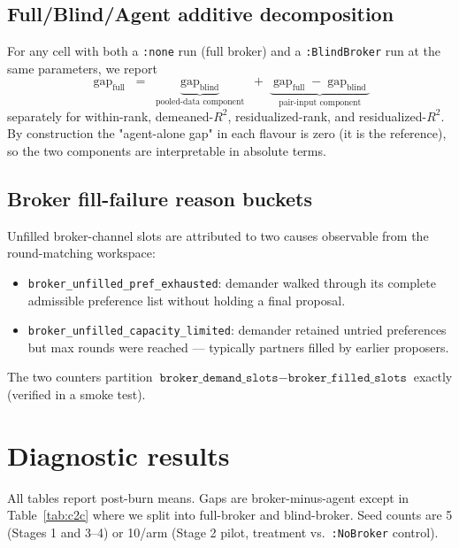 \documentclass[11pt,a4paper]{article}
\begin{document}
\subsection{Full/Blind/Agent additive decomposition}
For any cell with both a \texttt{:none} run (full broker) and a \texttt{:BlindBroker} run at the same parameters, we report
\begin{equation}
\label{eq:fullblind}
\operatorname{gap}_{\text{full}} \;=\; \underbrace{\operatorname{gap}_{\text{blind}}}_{\text{pooled-data component}}
\;+\; \underbrace{\operatorname{gap}_{\text{full}} - \operatorname{gap}_{\text{blind}}}_{\text{pair-input component}}
\end{equation}
separately for within-rank, demeaned-$R^2$, residualized-rank, and residualized-$R^2$. By construction the "agent-alone gap" in each flavour is zero (it is the reference), so the two components are interpretable in absolute terms.

\subsection{Broker fill-failure reason buckets}
Unfilled broker-channel slots are attributed to two causes observable from the round-matching workspace:
\begin{itemize}[leftmargin=1.5em]
\item \texttt{broker\_unfilled\_pref\_exhausted}: demander walked through its complete admissible preference list without holding a final proposal.
\item \texttt{broker\_unfilled\_capacity\_limited}: demander retained untried preferences but max rounds were reached --- typically partners filled by earlier proposers.
\end{itemize}
The two counters partition $\texttt{broker\_demand\_slots}-\texttt{broker\_filled\_slots}$ exactly (verified in a smoke test).

\section{Diagnostic results}
\label{sec:results}
All tables report post-burn means. Gaps are broker-minus-agent except in Table~\ref{tab:c2c} where we split into full-broker and blind-broker. Seed counts are 5 (Stages 1 and 3--4) or 10/arm (Stage 2 pilot, treatment vs.\ \texttt{:NoBroker} control).
\end{document}
